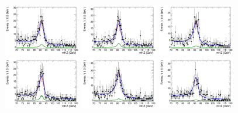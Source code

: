 \begin{figure}[!htbp]
\begin{center}
 \includegraphics[width=0.3\textwidth]{figures_and_tables/modeling_xchecks/plots/ZToUpsilon1SPhoton_Cat0_signalStrenght_20/Cat0_mHZ_fit_s}
\includegraphics[width=0.3\textwidth]{figures_and_tables/modeling_xchecks/plots/ZToUpsilon2SPhoton_Cat0_signalStrenght_20/Cat0_mHZ_fit_s}
\includegraphics[width=0.3\textwidth]{figures_and_tables/modeling_xchecks/plots/ZToUpsilon3SPhoton_Cat0_signalStrenght_20/Cat0_mHZ_fit_s}
\includegraphics[width=0.3\textwidth]{figures_and_tables/modeling_xchecks/plots/ZToUpsilon1SPhoton_Cat0_signalStrenght_50/Cat0_mHZ_fit_s}
\includegraphics[width=0.3\textwidth]{figures_and_tables/modeling_xchecks/plots/ZToUpsilon2SPhoton_Cat0_signalStrenght_50/Cat0_mHZ_fit_s}
\includegraphics[width=0.3\textwidth]{figures_and_tables/modeling_xchecks/plots/ZToUpsilon3SPhoton_Cat0_signalStrenght_50/Cat0_mHZ_fit_s}

\end{center}
\end{figure}
